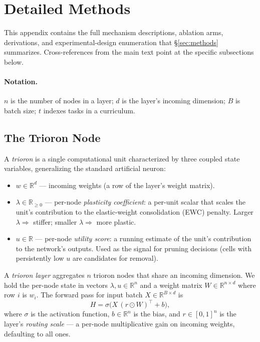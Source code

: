 \documentclass[11pt]{article}
\newcommand{\R}{\mathbb{R}}
\begin{document}
\appendix
\section{Detailed Methods}
\label{app:methods-detail}

This appendix contains the full mechanism descriptions, ablation
arms, derivations, and experimental-design enumeration that
\S\ref{sec:methods} summarizes. Cross-references from the main text
point at the specific subsections below.


\paragraph{Notation.}
$n$ is the number of nodes in a layer; $d$ is the layer's incoming
dimension; $B$ is batch size; $t$ indexes tasks in a curriculum.

\subsection{The Trioron Node}
\label{sec:trioron-node}\label{app:trioron-node}

A \emph{trioron} is a single computational unit characterized by three
coupled state variables, generalizing the standard artificial neuron:

\begin{itemize}[leftmargin=1.5em]
  \item $w \in \R^{d}$ --- incoming weights (a row of the layer's weight
        matrix).
  \item $\lambda \in \R_{\geq 0}$ --- per-node \emph{plasticity coefficient}:
        a per-unit scalar that scales the unit's contribution to the
        elastic-weight consolidation (EWC) penalty. Larger
        $\lambda \Rightarrow$ stiffer; smaller $\lambda \Rightarrow$ more
        plastic.
  \item $u \in \R$ --- per-node \emph{utility score}: a running estimate
        of the unit's contribution to the network's outputs. Used as the
        signal for pruning decisions (cells with persistently low $u$
        are candidates for removal).
\end{itemize}

A \emph{trioron layer} aggregates $n$ trioron nodes that share an incoming
dimension. We hold the per-node state in vectors $\lambda, u \in \R^{n}$
and a weight matrix $W \in \R^{n \times d}$ where row $i$ is $w_i$. The
forward pass for input batch $X \in \R^{B \times d}$ is
\begin{equation}
  H = \sigma\!\bigl(X\,(r \odot W)^{\top} + b\bigr),
\end{equation}
where $\sigma$ is the activation function, $b \in \R^{n}$ is the bias,
and $r \in [0, 1]^{n}$ is the layer's \emph{routing scale} --- a per-node
multiplicative gain on incoming weights, defaulting to all ones.
\end{document}
